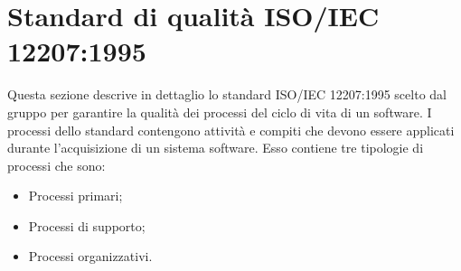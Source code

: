 \section{Standard di qualità ISO/IEC 12207:1995}
Questa sezione descrive in dettaglio lo standard ISO/IEC 12207:1995 scelto dal gruppo per garantire la qualità dei processi del ciclo di vita di un software. I processi dello standard contengono attività e compiti che devono essere applicati durante l'acquisizione di un sistema software. Esso contiene tre tipologie di processi che sono: 
\begin{itemize}
\item Processi primari;
\item Processi di supporto;
\item Processi organizzativi.
\end{itemize}




